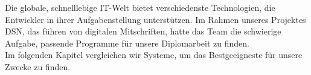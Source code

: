 
Die globale, schnelllebige IT-Welt bietet verschiedenste Technologien, die Entwickler in ihrer Aufgabenstellung unterstützen. Im Rahmen unseres Projektes DSN, das führen von digitalen Mitschriften, hatte das Team die schwierige Aufgabe, passende Programme für unsere Diplomarbeit zu finden.\\
Im folgenden Kapitel vergleichen wir Systeme, um das Bestgeeigneste für unsere Zwecke zu finden.